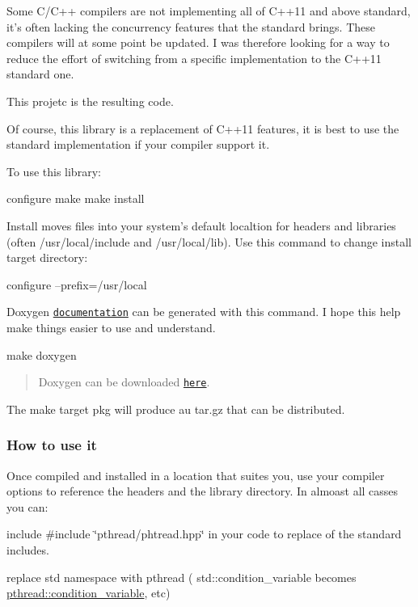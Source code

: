 Some C/\+C++ compilers are not implementing all of C++11 and above standard, it's often lacking the concurrency features that the standard brings. These compilers will at some point be updated. I was therefore looking for a way to reduce the effort of switching from a specific implementation to the C++11 standard one.

This projetc is the resulting code.

Of course, this library is a replacement of C++11 features, it is best to use the standard implementation if your compiler support it.

To use this library\+: \begin{DoxyVerb}configure
make
make install
\end{DoxyVerb}


Install moves files into your system's default localtion for headers and libraries (often /usr/local/include and /usr/local/lib). Use this command to change install target directory\+: \begin{DoxyVerb}configure --prefix=/usr/local
\end{DoxyVerb}


Doxygen \href{http://herbertkoelman.github.io/cpp-pthread/doc/html/}{\tt documentation} can be generated with this command. I hope this help make things easier to use and understand. \begin{DoxyVerb}make doxygen
\end{DoxyVerb}


\begin{quote}
Doxygen can be downloaded \href{http://www.stack.nl/~dimitri/doxygen/index.html}{\tt here}. \end{quote}


The {\ttfamily make} target {\ttfamily pkg} will produce au tar.\+gz that can be distributed.

\subsubsection*{How to use it}

Once compiled and installed in a location that suites you, use your compiler options to reference the headers and the library directory. In almoast all casses you can\+:
\begin{DoxyItemize}
\item include {\ttfamily \#include \char`\"{}pthread/phtread.\+hpp\char`\"{}} in your code to replace of the standard includes.
\item replace {\ttfamily std} namespace with {\ttfamily pthread} ( std\+::condition\+\_\+variable becomes \hyperlink{classpthread_1_1condition__variable}{pthread\+::condition\+\_\+variable}, etc)
\end{DoxyItemize}

